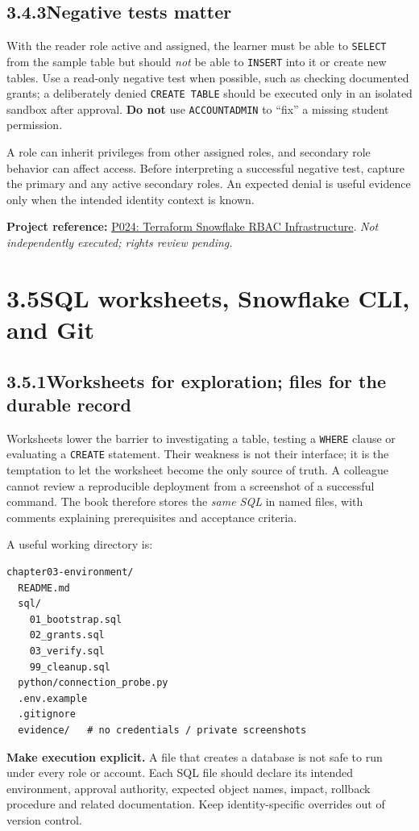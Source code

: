 \documentclass[11pt,twoside]{article}
\newcommand{\topic}[2]{\subsection*{#1\quad #2}}
\newcommand{\repo}[2]{\par\begingroup\fontsize{8.0}{9.6}\selectfont\sffamily\color{inkgray}\textbf{Project reference:} \href{#2}{#1}. \textit{Not independently executed; rights review pending.}\par\endgroup}
\begin{document}
\topic{3.4.3}{Negative tests matter}
With the reader role active and assigned, the learner must be able to \texttt{SELECT} from the sample table but should \emph{not} be able to \texttt{INSERT} into it or create new tables. Use a read-only negative test when possible, such as checking documented grants; a deliberately denied \texttt{CREATE TABLE} should be executed only in an isolated sandbox after approval. \textbf{Do not} use \texttt{ACCOUNTADMIN} to ``fix'' a missing student permission.

A role can inherit privileges from other assigned roles, and secondary role behavior can affect access. Before interpreting a successful negative test, capture the primary and any active secondary roles. An expected denial is useful evidence only when the intended identity context is known.
\repo{P024: Terraform Snowflake RBAC Infrastructure}{https://github.com/Infostrux-Solutions/terraform-snowflake-rbac-infra}

\newpage
\section*{3.5\quad SQL worksheets, Snowflake CLI, and Git}
\topic{3.5.1}{Worksheets for exploration; files for the durable record}
Worksheets lower the barrier to investigating a table, testing a \texttt{WHERE} clause or evaluating a \texttt{CREATE} statement. Their weakness is not their interface; it is the temptation to let the worksheet become the only source of truth. A colleague cannot review a reproducible deployment from a screenshot of a successful command. The book therefore stores the \emph{same SQL} in named files, with comments explaining prerequisites and acceptance criteria.

A useful working directory is:
\begin{lstlisting}[caption={Proposed Chapter 3 companion-lab repository.}]
chapter03-environment/
  README.md
  sql/
    01_bootstrap.sql
    02_grants.sql
    03_verify.sql
    99_cleanup.sql
  python/connection_probe.py
  .env.example
  .gitignore
  evidence/   # no credentials / private screenshots
\end{lstlisting}
\textbf{Make execution explicit.} A file that creates a database is not safe to run under every role or account. Each SQL file should declare its intended environment, approval authority, expected object names, impact, rollback procedure and related documentation. Keep identity-specific overrides out of version control.
\end{document}
